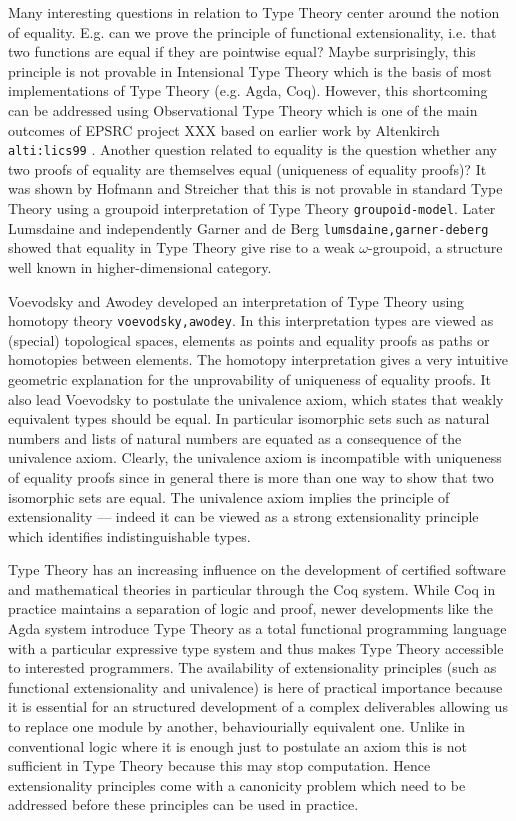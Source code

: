\documentclass[a4paper]{article}
\renewcommand{\cite}[1]{{\tt #1}}
\begin{document}
Many interesting questions in relation to Type Theory center around
the notion of equality. E.g. can we prove the principle of functional
extensionality, i.e. that two functions are equal if they are
pointwise equal? Maybe surprisingly, this principle is not provable in
Intensional Type Theory which is the basis of most implementations of
Type Theory (e.g. Agda, Coq). However, this shortcoming can be
addressed using Observational Type Theory which is one of the main
outcomes of EPSRC project XXX based on earlier work by Altenkirch
\cite{alti:lics99} . Another question related to equality is the
question whether any two proofs of equality are themselves equal
(uniqueness of equality proofs)? It was shown by Hofmann and Streicher
that this is not provable in standard Type Theory using a groupoid
interpretation of Type Theory \cite{groupoid-model}. Later Lumsdaine
and independently Garner and de Berg \cite{lumsdaine,garner-deberg}
showed that equality in Type Theory give rise to a weak
$\omega$-groupoid, a structure well known in higher-dimensional
category.

Voevodsky and Awodey developed an interpretation of Type Theory using
homotopy theory \cite{voevodsky,awodey}. In this interpretation types
are viewed as (special) topological spaces, elements as points and
equality proofs as paths or homotopies between elements. The homotopy
interpretation gives a very intuitive geometric explanation for the
unprovability of uniqueness of equality proofs. It also lead Voevodsky
to postulate the univalence axiom, which states that weakly equivalent
types should be equal. In particular isomorphic sets such as natural
numbers and lists of natural numbers are equated as a consequence of
the univalence axiom. Clearly, the univalence axiom is incompatible
with uniqueness of equality proofs since in general there is more than
one way to show that two isomorphic sets are equal. The univalence
axiom implies the principle of extensionality --- indeed it can be viewed
as a strong extensionality principle which identifies
indistinguishable types.  

Type Theory has an increasing influence on the development of
certified software and mathematical theories in particular through the
Coq system. While Coq in practice maintains a separation of logic and
proof, newer developments like the Agda system introduce Type Theory
as a total functional programming language with a particular
expressive type system and thus makes Type Theory accessible to
interested programmers. The availability of extensionality principles
(such as functional extensionality and univalence)
is here of practical importance because it is essential for an
structured development of a complex deliverables allowing us to 
replace one module by another, behaviourially equivalent one.
Unlike in conventional logic where it is enough just to postulate an
axiom this is not sufficient in Type Theory because this may stop
computation. Hence extensionality principles come with a canonicity
problem which need to be addressed before these principles can be used
in practice. 
\end{document}
